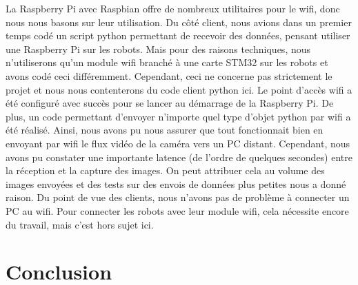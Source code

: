 \documentclass{article}
\begin{document}
La Raspberry Pi avec Raspbian offre de nombreux utilitaires pour le wifi, donc nous nous basons sur leur utilisation. Du côté client, nous avions dans un premier temps codé un script python permettant de recevoir des données, pensant utiliser une Raspberry Pi sur les robots. Mais pour des raisons techniques, nous n'utiliserons qu'un module wifi branché à une carte STM32 sur les robots et avons codé ceci différemment. Cependant, ceci ne concerne pas strictement le projet et nous nous contenterons du code client python ici.
\newline\newline
Le point d'accès wifi a été configuré avec succès pour se lancer au démarrage de la Raspberry Pi. De plus, un code permettant d'envoyer n'importe quel type d'objet python par wifi a été réalisé. Ainsi, nous avons pu nous assurer que tout fonctionnait bien en envoyant par wifi le flux vidéo de la caméra vers un PC distant. Cependant, nous avons pu constater une importante latence (de l'ordre de quelques secondes) entre la réception et la capture des images. On peut attribuer cela au volume des images envoyées et des tests sur des envois de données plus petites nous a donné raison.
Du point de vue des clients, nous n'avons pas de problème à connecter un PC au wifi. Pour connecter les robots avec leur module wifi, cela nécessite encore du travail, mais c'est hors sujet ici.
\newpage

\part{Conclusion}





\end{document}
